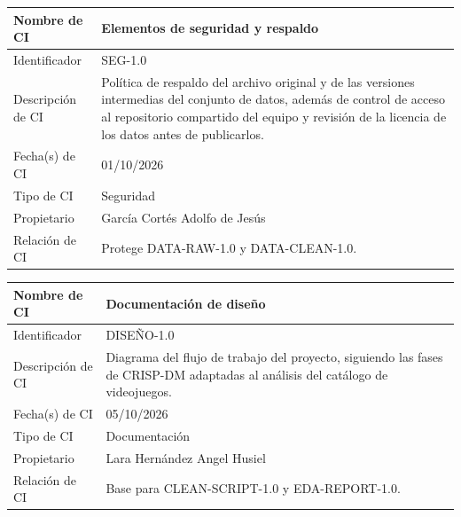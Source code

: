 \documentclass[letterpaper,11pt]{article}
\begin{document}
\noindent\begin{minipage}{\textwidth}
\small\renewcommand{\arraystretch}{1.9}
\begin{tabularx}{\textwidth}{|p{3.3cm}|Y|}
\hline
Nombre de CI & Elementos de seguridad y respaldo \\ \hline
Identificador & SEG-1.0 \\ \hline
Descripción de CI & Política de respaldo del archivo original y de las versiones intermedias del conjunto de datos, además de control de acceso al repositorio compartido del equipo y revisión de la licencia de los datos antes de publicarlos. \\ \hline
Fecha(s) de CI & 01/10/2026 \\ \hline
Tipo de CI & Seguridad \\ \hline
Propietario & García Cortés Adolfo de Jesús \\ \hline
Relación de CI & Protege DATA-RAW-1.0 y DATA-CLEAN-1.0. \\ \hline
\end{tabularx}
\end{minipage}\par\bigskip
\noindent\begin{minipage}{\textwidth}
\small\renewcommand{\arraystretch}{1.9}
\begin{tabularx}{\textwidth}{|p{3.3cm}|Y|}
\hline
Nombre de CI & Documentación de diseño \\ \hline
Identificador & DISEÑO-1.0 \\ \hline
Descripción de CI & Diagrama del flujo de trabajo del proyecto, siguiendo las fases de CRISP-DM adaptadas al análisis del catálogo de videojuegos. \\ \hline
Fecha(s) de CI & 05/10/2026 \\ \hline
Tipo de CI & Documentación \\ \hline
Propietario & Lara Hernández Angel Husiel \\ \hline
Relación de CI & Base para CLEAN-SCRIPT-1.0 y EDA-REPORT-1.0. \\ \hline
\end{tabularx}
\end{minipage}\par\bigskip
\end{document}
